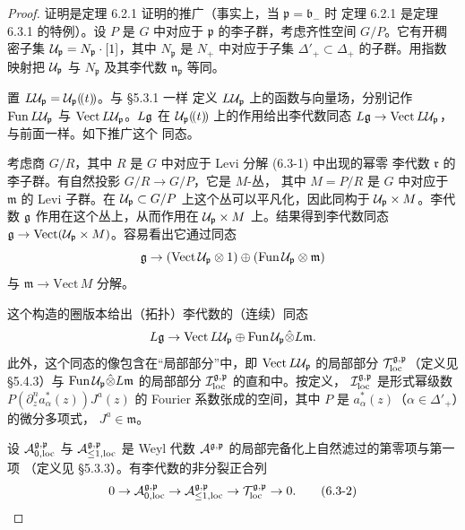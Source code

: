 \begin{proof}
    证明是定理 6.2.1 证明的推广（事实上，当 $\mathfrak p=\mathfrak b_-$ 时
    定理 6.2.1 是定理 6.3.1 的特例）。设 $P$ 是 $G$ 中对应于 $\mathfrak p$
    的李子群，考虑齐性空间 $G/P$。它有开稠密子集
    $\mathcal{U}_{\mathfrak p}=N_{\mathfrak p}\cdot[1]$，其中 $N_{\mathfrak p}$ 是
    $N_+$ 中对应于子集 $\Delta'_+\subset\Delta_+$ 的子群。用指数映射把
    $\mathcal{U}_{\mathfrak p}$ 与 $N_{\mathfrak p}$ 及其李代数
    $\mathfrak n_{\mathfrak p}$ 等同。

    置 $L\mathcal{U}_{\mathfrak p}=\mathcal{U}_{\mathfrak p}(\!(t)\!)$。与 \S5.3.1 一样
    定义 $L\mathcal{U}_{\mathfrak p}$ 上的函数与向量场，分别记作
    $\mathrm{Fun}\,L\mathcal{U}_{\mathfrak p}$ 与
    $\mathrm{Vect}\,L\mathcal{U}_{\mathfrak p}$。$L\mathfrak{g}$ 在
    $\mathcal{U}_{\mathfrak p}(\!(t)\!)$ 上的作用给出李代数同态
    $L\mathfrak{g}\to\mathrm{Vect}\,L\mathcal{U}_{\mathfrak p}$，与前面一样。如下推广这个
    同态。

    考虑商 $G/R$，其中 $R$ 是 $G$ 中对应于 Levi 分解 (6.3-1) 中出现的幂零
    李代数 $\mathfrak r$ 的李子群。有自然投影 $G/R\to G/P$，它是 $M$-丛，
    其中 $M=P/R$ 是 $G$ 中对应于 $\mathfrak m$ 的 Levi 子群。在
    $\mathcal{U}_{\mathfrak p}\subset G/P$ 上这个丛可以平凡化，因此同构于
    $\mathcal{U}_{\mathfrak p}\times M$。李代数 $\mathfrak{g}$ 作用在这个丛上，从而作用在
    $\mathcal{U}_{\mathfrak p}\times M$ 上。结果得到李代数同态
    $\mathfrak{g}\to\mathrm{Vect}(\mathcal{U}_{\mathfrak p}\times M)$。容易看出它通过同态
    \[
        \mathfrak{g}\to(\mathrm{Vect}\,\mathcal{U}_{\mathfrak p}\otimes1)
        \oplus(\mathrm{Fun}\,\mathcal{U}_{\mathfrak p}\otimes\mathfrak m)
    \]
    与 $\mathfrak m\to\mathrm{Vect}\,M$ 分解。

    这个构造的圈版本给出（拓扑）李代数的（连续）同态
    \[
        L\mathfrak{g}\to\mathrm{Vect}\,L\mathcal{U}_{\mathfrak p}
        \oplus\mathrm{Fun}\,\mathcal{U}_{\mathfrak p}
        \hat{\otimes}L\mathfrak m.
    \]
    此外，这个同态的像包含在“局部部分”中，即
    $\mathrm{Vect}\,L\mathcal{U}_{\mathfrak p}$ 的局部部分
    $\mathcal{T}^{\mathfrak g,\mathfrak p}_{\mathrm{loc}}$（定义见 \S5.4.3）与
    $\mathrm{Fun}\,\mathcal{U}_{\mathfrak p}\hat{\otimes}L\mathfrak m$ 的局部部分
    $\mathcal{I}^{\mathfrak g,\mathfrak p}_{\mathrm{loc}}$ 的直和中。按定义，
    $\mathcal{I}^{\mathfrak g,\mathfrak p}_{\mathrm{loc}}$ 是形式幂级数
    $P(\partial_z^na^*_\alpha(z))J^a(z)$ 的 Fourier 系数张成的空间，其中
    $P$ 是 $a^*_\alpha(z)$（$\alpha\in\Delta'_+$）的微分多项式，
    $J^a\in\mathfrak m$。

    设 $\mathcal{A}^{\mathfrak g,\mathfrak p}_{0,\mathrm{loc}}$ 与
    $\mathcal{A}^{\mathfrak g,\mathfrak p}_{\le1,\mathrm{loc}}$ 是 Weyl 代数
    $\mathcal{A}^{\mathfrak g,\mathfrak p}$ 的局部完备化上自然滤过的第零项与第一项
    （定义见 \S5.3.3）。有李代数的非分裂正合列
    \begin{equation}
        0\to\mathcal{A}^{\mathfrak g,\mathfrak p}_{0,\mathrm{loc}}
        \to\mathcal{A}^{\mathfrak g,\mathfrak p}_{\le1,\mathrm{loc}}
        \to\mathcal{T}^{\mathfrak g,\mathfrak p}_{\mathrm{loc}}\to0.
        \tag{6.3-2}
    \end{equation}


\end{proof}
